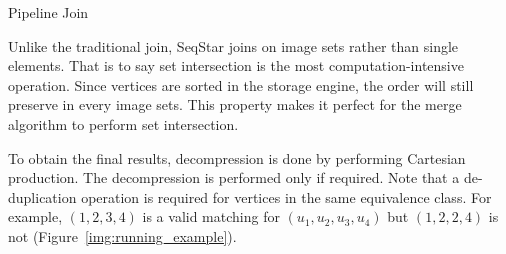 \begin{algorithm}[ht]
  \caption{Pipeline Join}\label{alg:join}
\end{algorithm}

Unlike the traditional join, SeqStar joins on image sets rather than single elements.
That is to say set intersection is the most computation-intensive operation.
Since vertices are sorted in the storage engine,
the order will still preserve in every image sets.
This property makes it perfect for the merge algorithm to perform set intersection.

To obtain the final results, decompression is done by performing Cartesian production.
The decompression is performed only if required.
Note that a de-duplication operation is required for vertices in the same equivalence class.
For example, $(1, 2, 3, 4)$ is a valid matching for $(u_1, u_2, u_3, u_4)$ but $(1, 2, 2, 4)$ is not (Figure~\ref{img:running_example}).


